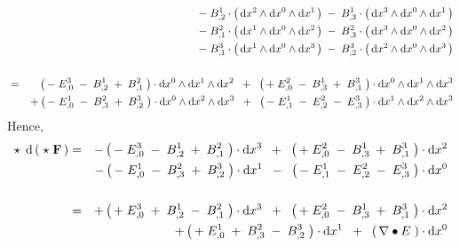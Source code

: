 \begin{enumerate}
\begin{eqnarray*}
	&&
		\; - \; B^{1}_{,2} \cdot\left(\,\d x^{2} \wedge \d x^{0} \wedge \d x^{1}\,\right)
		\; - \; B^{1}_{,3} \cdot\left(\,\d x^{3} \wedge \d x^{0} \wedge \d x^{1}\,\right)
	\\
	&&
		\; - \; B^{2}_{,1} \cdot\left(\,\d x^{1} \wedge \d x^{0} \wedge \d x^{2}\,\right)
		\; - \; B^{2}_{,3} \cdot\left(\,\d x^{3} \wedge \d x^{0} \wedge \d x^{2}\,\right)
	\\
	&&
		\; - \; B^{3}_{,1} \cdot\left(\,\d x^{1} \wedge \d x^{0} \wedge \d x^{3}\,\right)
		\; - \; B^{3}_{,2} \cdot\left(\,\d x^{2} \wedge \d x^{0} \wedge \d x^{3}\,\right)
	\\ \\
	& = &
		{\color{white}+}
		\left(\,
			   - \; E^{3}_{,0}
			\; - \; B^{1}_{,2}
			\; + \; B^{2}_{,1}
			\;\right)
			\cdot \d x^ {0} \wedge \d x^{1} \wedge \d x^{2}
		\;\; + \;\;
		\left(\,
			   + \; E^{2}_{,0}
			\; - \; B^{1}_{,3}
			\; + \; B^{3}_{,1}
			\;\right)
			\cdot \d x^ {0} \wedge \d x^{1} \wedge \d x^{3}
	\\
	&&
		+
		\left(\,
			   - \; E^{1}_{,0}
			\; - \; B^{2}_{,3}
			\; + \; B^{3}_{,2}
			\;\right)
			\cdot \d x^ {0} \wedge \d x^{2} \wedge \d x^{3}
		\;\; + \;\;
		\left(\,
			- \; E^{1}_{,1}
			\; - \; E^{2}_{,2}
			\; - \; E^{3}_{,3}
			\;\right)
			\cdot \d x^ {1} \wedge \d x^{2} \wedge \d x^{3}
	\end{eqnarray*}
	Hence,
	\begin{eqnarray*}
	\star\;\,\d\left(\;\star\;\mathbf{F}\,\right)
	& = &
		-
		\left(\,
			   - \; E^{3}_{,0}
			\; - \; B^{1}_{,2}
			\; + \; B^{2}_{,1}
			\;\right)
			\cdot \d x^ {3}
		\;\; + \;\;
		\left(\,
			   + \; E^{2}_{,0}
			\; - \; B^{1}_{,3}
			\; + \; B^{3}_{,1}
			\;\right)
			\cdot \d x^ {2}
	\\
	&&
		-
		\left(\,
			   - \; E^{1}_{,0}
			\; - \; B^{2}_{,3}
			\; + \; B^{3}_{,2}
			\;\right)
			\cdot \d x^ {1}
		\;\; - \;\;
		\left(\,
			- \; E^{1}_{,1}
			\; - \; E^{2}_{,2}
			\; - \; E^{3}_{,3}
			\;\right)
			\cdot \d x^ {0}
	\\ \\
	& = &
		+
		\left(\, + \; E^{3}_{,0} \; + \; B^{1}_{,2} \; - \; B^{2}_{,1} \;\right)
			\cdot \d x^ {3}
		\;\;+\;\;
		\left(\, + \; E^{2}_{,0} \; - \; B^{1}_{,3} \; + \; B^{3}_{,1} \;\right)
			\cdot \d x^ {2}
	\\
	&&
		+ \left(\, + \; E^{1}_{,0} \; + \; B^{2}_{,3} \; - \; B^{3}_{,2} \;\right)
			\cdot \d x^ {1}
		\;\;+\;\;
		\left(\, \nabla \bullet E \;\right) \cdot \d x^ {0}
	\\ \\

\end{eqnarray*}
\end{enumerate}
